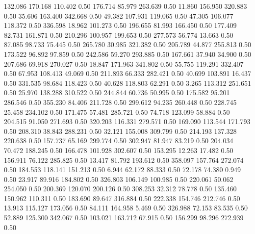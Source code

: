  132.086  170.168  110.402         0.50
 176.714   85.979  263.639         0.50
  11.860  156.950  320.883         0.50
  35.606  163.400  342.668         0.50
  49.382  107.931  119.065         0.50
  47.305  106.077  118.372         0.50
 336.598   18.962  101.273         0.50
 196.655   81.993  166.450         0.50
 177.409   82.731  161.871         0.50
 210.296  100.957  199.653         0.50
 277.573   56.774   13.663         0.50
  87.085   98.733   75.445         0.50
 265.780   30.985  321.382         0.50
 205.789   44.877  255.813         0.50
 173.522   96.892   97.859         0.50
 242.586   59.270  293.885         0.50
 167.661   37.940   34.900         0.50
 207.686   69.918  270.027         0.50
  18.847  171.963  341.802         0.50
  55.755  119.291  332.407         0.50
  67.953  108.413   49.069         0.50
 211.893   66.333  282.421         0.50
  40.699  103.891   16.437         0.50
 331.535   98.684  118.423         0.50
  40.628  118.803   62.291         0.50
   3.265  113.312  251.651         0.50
  25.970  138.288  310.522         0.50
 244.844   60.736   50.995         0.50
 175.582   95.201  286.546         0.50
 355.230   84.406  211.728         0.50
 299.612   94.235  260.448         0.50
 228.745   25.458  234.102         0.50
 171.475   57.481  285.721         0.50
  74.718  123.099   58.884         0.50
 204.515   91.050  271.693         0.50
 320.203  116.331  279.571         0.50
 169.090  113.544  171.793         0.50
 208.310   38.843  288.231         0.50
  32.121  155.008  309.799         0.50
 214.193  137.328  220.638         0.50
 157.737   65.169  299.774         0.50
 302.947   81.947   83.219         0.50
 204.034   70.472  188.245         0.50
 166.478  101.928  302.607         0.50
 153.295   12.263   17.482         0.50
 156.911   76.122  285.825         0.50
  13.417   81.792  193.612         0.50
 358.097  157.764  272.074         0.50
 184.553  118.141  151.213         0.50
   6.944   62.172   88.333         0.50
  72.178   74.380    0.949         0.50
  23.917   89.916  184.802         0.50
 326.803  106.149  100.985         0.50
 220.061   50.062  254.050         0.50
 200.369  120.070  200.126         0.50
 308.253   32.312   78.778         0.50
 135.460  150.962  110.311         0.50
 183.690   89.647  316.884         0.50
 222.338  154.746  212.746         0.50
  13.913  115.127  173.056         0.50
  84.111  164.958    5.469         0.50
 326.988   72.153   83.535         0.50
  52.889  125.300  342.067         0.50
 103.021  163.712   67.915         0.50
 156.299   98.296  272.939         0.50
